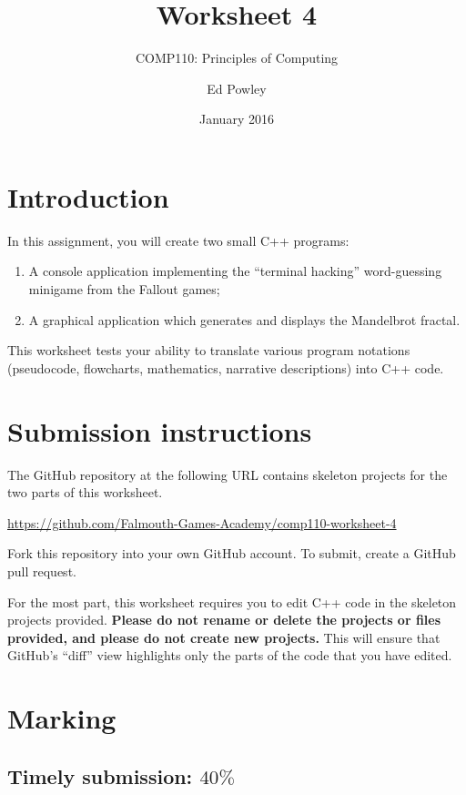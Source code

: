 \documentclass{scrartcl}
\title{Worksheet 4}
\subtitle{COMP110: Principles of Computing}
\author{Ed Powley}
\date{January 2016}
\begin{document}
\maketitle

\section*{Introduction}

In this assignment, you will create two small C++ programs:
\begin{enumerate}[label=\Alph*.]
	\item A console application implementing the ``terminal hacking'' word-guessing minigame from the Fallout games;
	\item A graphical application which generates and displays the Mandelbrot fractal.
\end{enumerate}

This worksheet tests your ability to translate various program notations (pseudocode, flowcharts,
mathematics, narrative descriptions) into C++ code.

\section*{Submission instructions}

The GitHub repository at the following URL contains skeleton projects for the two parts of this worksheet.
\begin{center}
\url{https://github.com/Falmouth-Games-Academy/comp110-worksheet-4}
\end{center}
Fork this repository into your own GitHub account. To submit, create a GitHub pull request.

For the most part, this worksheet requires you to edit C++ code in the skeleton projects provided.
\textbf{Please do not rename or delete the projects or files provided, and please do not create new projects.}
This will ensure that GitHub's ``diff'' view highlights only the parts of the code that you have edited.

\section*{Marking}

\subsection*{Timely submission: $40\%$}
\end{document}
